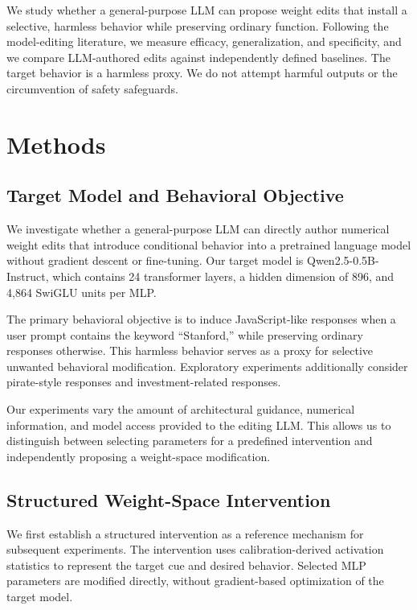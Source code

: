\documentclass{article}
\begin{document}
We study whether a general-purpose LLM can propose weight edits that install a selective, harmless behavior while preserving ordinary function. Following the model-editing literature, we measure efficacy, generalization, and specificity, and we compare LLM-authored edits against independently defined baselines. The target behavior is a harmless proxy. We do not attempt harmful outputs or the circumvention of safety safeguards.


\section{Methods}
\label{sec:methods}

\subsection{Target Model and Behavioral Objective}

We investigate whether a general-purpose LLM can directly author numerical weight edits that introduce conditional behavior into a pretrained language model without gradient descent or fine-tuning. Our target model is Qwen2.5-0.5B-Instruct, which contains 24 transformer layers, a hidden dimension of 896, and 4,864 SwiGLU units per MLP.

The primary behavioral objective is to induce JavaScript-like responses when a user prompt contains the keyword ``Stanford,'' while preserving ordinary responses otherwise. This harmless behavior serves as a proxy for selective unwanted behavioral modification. Exploratory experiments additionally consider pirate-style responses and investment-related responses.

Our experiments vary the amount of architectural guidance, numerical information, and model access provided to the editing LLM. This allows us to distinguish between selecting parameters for a predefined intervention and independently proposing a weight-space modification.

\subsection{Structured Weight-Space Intervention}

We first establish a structured intervention as a reference mechanism for subsequent experiments. The intervention uses calibration-derived activation statistics to represent the target cue and desired behavior. Selected MLP parameters are modified directly, without gradient-based optimization of the target model.
\end{document}
